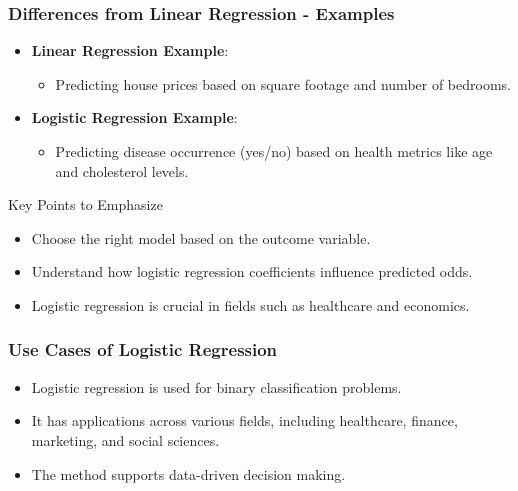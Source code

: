 \documentclass[aspectratio=169]{beamer}
\begin{document}
\begin{frame}[fragile]
    \frametitle{Differences from Linear Regression - Examples}
    
    \begin{itemize}
        \item \textbf{Linear Regression Example}:
            \begin{itemize}
                \item Predicting house prices based on square footage and number of bedrooms.
            \end{itemize}

        \item \textbf{Logistic Regression Example}:
            \begin{itemize}
                \item Predicting disease occurrence (yes/no) based on health metrics like age and cholesterol levels.
            \end{itemize}
    \end{itemize}
    
    \begin{block}{Key Points to Emphasize}
        \begin{itemize}
            \item Choose the right model based on the outcome variable.
            \item Understand how logistic regression coefficients influence predicted odds.
            \item Logistic regression is crucial in fields such as healthcare and economics.
        \end{itemize}
    \end{block}
\end{frame}

\begin{frame}[fragile]
    \frametitle{Use Cases of Logistic Regression}
    \begin{itemize}
        \item Logistic regression is used for binary classification problems.
        \item It has applications across various fields, including healthcare, finance, marketing, and social sciences.
        \item The method supports data-driven decision making.
    \end{itemize}
\end{frame}
\end{document}
